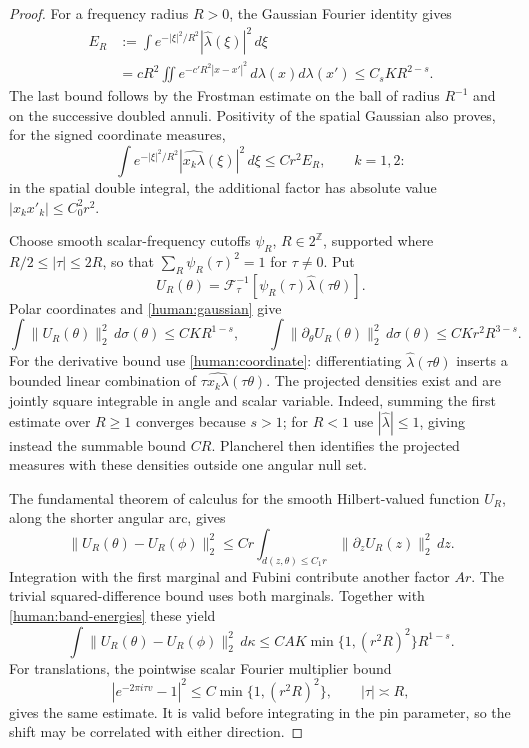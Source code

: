 \begin{proof}
For a frequency radius \(R>0\), the Gaussian Fourier identity gives
\begin{align}
 E_R&:=\int e^{-|\xi|^2/R^2}|\widehat\lambda(\xi)|^2\,d\xi
 \label{human:gaussian}\\
 &=cR^2\iint e^{-c'R^2|x-x'|^2}\,d\lambda(x)d\lambda(x')
 \le C_sKR^{2-s}.\nonumber
\end{align}
The last bound follows by the Frostman estimate on the ball of radius
\(R^{-1}\) and on the successive doubled annuli. Positivity of the
spatial Gaussian also proves, for the signed coordinate measures,
\begin{equation}\label{human:coordinate}
 \int e^{-|\xi|^2/R^2}|\widehat{x_k\lambda}(\xi)|^2\,d\xi
 \le C r^2E_R,\qquad k=1,2:
\end{equation}
in the spatial double integral, the additional factor has absolute
value \(|x_kx'_k|\le C_0^2r^2\).

Choose smooth scalar-frequency cutoffs \(\psi_R\), \(R\in2^{\mathbb Z}\),
supported where \(R/2\le|\tau|\le2R\), so that
\(\sum_R\psi_R(\tau)^2=1\) for \(\tau\ne0\). Put
\[
 U_R(\theta)=\mathcal F^{-1}_\tau
       [\psi_R(\tau)\widehat\lambda(\tau\theta)].
\]
Polar coordinates and \eqref{human:gaussian} give
\begin{equation}\label{human:band-energies}
 \int\|U_R(\theta)\|_2^2\,d\sigma(\theta)\le CKR^{1-s},
 \qquad
 \int\|\partial_\theta U_R(\theta)\|_2^2\,d\sigma(\theta)
 \le CKr^2R^{3-s}.
\end{equation}
For the derivative bound use \eqref{human:coordinate}: differentiating
\(\widehat\lambda(\tau\theta)\) inserts a bounded linear combination
of \(\tau\widehat{x_k\lambda}(\tau\theta)\).
The projected densities exist and are jointly square integrable in
angle and scalar variable. Indeed, summing the first estimate over
\(R\ge1\) converges because \(s>1\); for \(R<1\) use
\(|\widehat\lambda|\le1\), giving instead the summable bound \(CR\).
Plancherel then identifies the projected measures with these densities
outside one angular null set.

The fundamental theorem of calculus for the smooth Hilbert-valued
function \(U_R\), along the shorter angular arc, gives
\[
 \|U_R(\theta)-U_R(\phi)\|_2^2
 \le Cr\int_{d(z,\theta)\le C_1r}
                     \|\partial_zU_R(z)\|_2^2\,dz.
\]
Integration with the first marginal and Fubini contribute another
factor \(Ar\). The trivial squared-difference bound uses both
marginals. Together with \eqref{human:band-energies} these yield
\[
 \int\|U_R(\theta)-U_R(\phi)\|_2^2\,d\kappa
 \le CAK\min\{1,(r^2R)^2\}R^{1-s}.
\]
For translations, the pointwise scalar Fourier multiplier bound
\[
 |e^{-2\pi i\tau v}-1|^2
 \le C\min\{1,(r^2R)^2\},\qquad |\tau|\asymp R,
\]
gives the same estimate. It is valid before integrating in the pin
parameter, so the shift may be correlated with either direction.


\end{proof}

